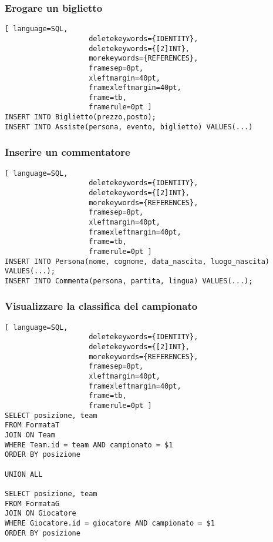 \documentclass{article}
\begin{document}
\subsubsection{Erogare un biglietto}
\begin{lstlisting}[ language=SQL,
                    deletekeywords={IDENTITY},
                    deletekeywords={[2]INT},
                    morekeywords={REFERENCES},
                    framesep=8pt,
                    xleftmargin=40pt,
                    framexleftmargin=40pt,
                    frame=tb,
                    framerule=0pt ]
INSERT INTO Biglietto(prezzo,posto);
INSERT INTO Assiste(persona, evento, biglietto) VALUES(...)
\end{lstlisting}

\subsubsection{Inserire un commentatore}
\begin{lstlisting}[ language=SQL,
                    deletekeywords={IDENTITY},
                    deletekeywords={[2]INT},
                    morekeywords={REFERENCES},
                    framesep=8pt,
                    xleftmargin=40pt,
                    framexleftmargin=40pt,
                    frame=tb,
                    framerule=0pt ]
INSERT INTO Persona(nome, cognome, data_nascita, luogo_nascita) VALUES(...);
INSERT INTO Commenta(persona, partita, lingua) VALUES(...);
\end{lstlisting}

\subsubsection{Visualizzare la classifica del campionato}
\begin{lstlisting}[ language=SQL,
                    deletekeywords={IDENTITY},
                    deletekeywords={[2]INT},
                    morekeywords={REFERENCES},
                    framesep=8pt,
                    xleftmargin=40pt,
                    framexleftmargin=40pt,
                    frame=tb,
                    framerule=0pt ]
SELECT posizione, team
FROM FormataT
JOIN ON Team
WHERE Team.id = team AND campionato = $1
ORDER BY posizione

UNION ALL

SELECT posizione, team
FROM FormataG
JOIN ON Giocatore
WHERE Giocatore.id = giocatore AND campionato = $1
ORDER BY posizione
\end{lstlisting}
\end{document}
